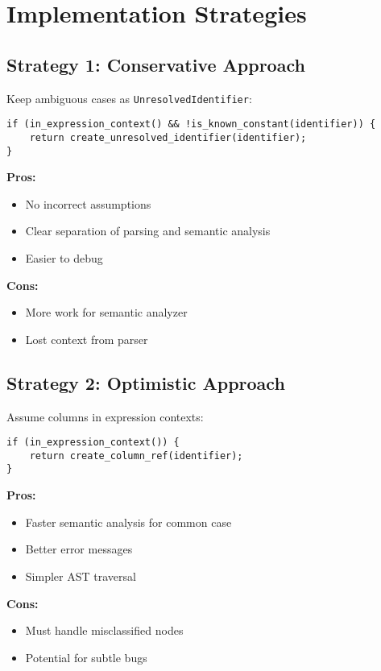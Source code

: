 \documentclass[11pt,a4paper]{article}
\begin{document}
\section{Implementation Strategies}

\subsection{Strategy 1: Conservative Approach}

Keep ambiguous cases as \texttt{UnresolvedIdentifier}:

\begin{lstlisting}[style=cpp]
if (in_expression_context() && !is_known_constant(identifier)) {
    return create_unresolved_identifier(identifier);
}
\end{lstlisting}

\textbf{Pros:}
\begin{itemize}
    \item No incorrect assumptions
    \item Clear separation of parsing and semantic analysis
    \item Easier to debug
\end{itemize}

\textbf{Cons:}
\begin{itemize}
    \item More work for semantic analyzer
    \item Lost context from parser
\end{itemize}

\subsection{Strategy 2: Optimistic Approach}

Assume columns in expression contexts:

\begin{lstlisting}[style=cpp]
if (in_expression_context()) {
    return create_column_ref(identifier);
}
\end{lstlisting}

\textbf{Pros:}
\begin{itemize}
    \item Faster semantic analysis for common case
    \item Better error messages
    \item Simpler AST traversal
\end{itemize}

\textbf{Cons:}
\begin{itemize}
    \item Must handle misclassified nodes
    \item Potential for subtle bugs
\end{itemize}
\end{document}
